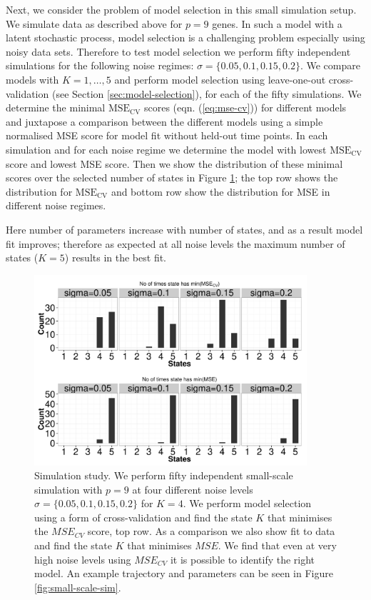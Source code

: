 Next, we consider the problem of model selection in this small simulation setup. We simulate data as described above for $p=9$ genes. In such a model with a latent stochastic process, model selection is a challenging problem especially using noisy data sets. Therefore to test model selection we perform fifty independent simulations for the following noise regimes: $\sigma = \lbrace 0.05, 0.1, 0.15, 0.2 \rbrace $. We compare models with $K = 1, \ldots, 5$ and perform model selection using leave-one-out cross-validation (see Section \ref{sec:model-selection}), for each of the fifty simulations. We determine the minimal $\mathrm{MSE_{CV}}$ scores (eqn. (\ref{eq:mse-cv})) for different models and juxtapose a comparison between the different models using a simple normalised MSE score for model fit without held-out time points. In each simulation and for each noise regime we determine the model with lowest $\mathrm{MSE_{CV}}$ score and lowest MSE score. Then we show the distribution of these minimal scores over the selected number of states in Figure \ref{fig:small-scale-modelSlct}; the top row shows the distribution for $\mathrm{MSE_{CV}}$ and bottom row show the distribution for MSE in different noise regimes.

Here number of parameters increase with number of states, and as a result model fit improves; therefore as expected at all noise levels the maximum number of states ($K=5$) results in the best fit.

\begin{figure}
  \centering
  \includegraphics[width=0.9\textwidth]{pics/hist-all.pdf}
  \caption{Simulation study. We perform fifty independent small-scale simulation with $p=9$ at four different noise levels $\sigma = \lbrace 0.05, 0.1, 0.15, 0.2\rbrace$ for $K=4$. We perform model selection using a form of cross-validation and find the state $K$ that minimises the $MSE_{CV}$ score, top row. As a comparison we also show fit to data and find the state $K$ that minimises $MSE$. We find that even at very high noise levels using $MSE_{CV}$ it is possible to identify the right model. An example trajectory and parameters can be seen in Figure \ref{fig:small-scale-sim}.}
  \label{fig:small-scale-modelSlct}
\end{figure}

